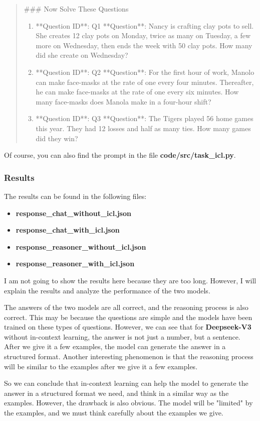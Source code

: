 \documentclass[a4paper,12pt]{article}
\begin{document}
\begin{quote}
    \#\#\# Now Solve These Questions
    \begin{enumerate}
        \item **Question ID**: Q1  
            **Question**: Nancy is crafting clay pots to sell. She creates 12 clay pots on Monday, twice as many on Tuesday, a few more on Wednesday, then ends the week with 50 clay pots. How many did she create on Wednesday?  
        \item **Question ID**: Q2  
            **Question**: For the first hour of work, Manolo can make face-masks at the rate of one every four minutes. Thereafter, he can make face-masks at the rate of one every six minutes. How many face-masks does Manola make in a four-hour shift?  
        \item **Question ID**: Q3  
            **Question**: The Tigers played 56 home games this year. They had 12 losses and half as many ties. How many games did they win? 
    \end{enumerate} 
\end{quote}

Of course, you can also find the prompt in the file \textbf{code/src/task\_icl.py}.

\subsubsection{Results}

The results can be found in the following files:
\begin{itemize}
    \item \textbf{response\_chat\_without\_icl.json}
    \item \textbf{response\_chat\_with\_icl.json}
    \item \textbf{response\_reasoner\_without\_icl.json}
    \item \textbf{response\_reasoner\_with\_icl.json}
\end{itemize}
I am not going to show the results here because they are too long. However, I will explain the results and analyze the performance of the two models.

The answers of the two models are all correct, and the reasoning process is also correct. This may be because the questions are simple and the models have been trained on these types of questions. However, we can see that for \textbf{Deepseek-V3} without in-context learning, the answer is not just a number, but a sentence. After we give it a few examples, the model can generate the answer in a structured format. Another interesting phenomenon is that the reasoning process will be similar to the examples after we give it a few examples. 

So we can conclude that in-context learning can help the model to generate the answer in a structured format we need, and think in a similar way as the examples. However, the drawback is also obvious. The model will be "limited" by the examples, and we must think carefully about the examples we give.

\printbibliography[heading=bibintoc, title={References}]
\end{document}
